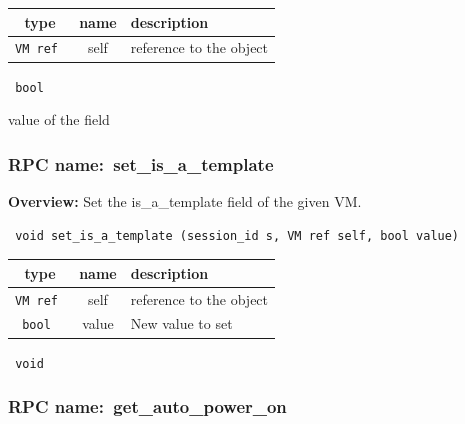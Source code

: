  
\vspace{0.3cm}
\begin{tabular}{|c|c|p{7cm}|}
 \hline
{\bf type} & {\bf name} & {\bf description} \\ \hline
{\tt VM ref } & self & reference to the object \\ \hline 

\end{tabular}

\vspace{0.3cm}

{\tt 
bool
}


value of the field
\vspace{0.3cm}
\vspace{0.3cm}
\vspace{0.3cm}
\subsubsection{RPC name:~set\_is\_a\_template}

{\bf Overview:} 
Set the is\_a\_template field of the given VM.

\begin{verbatim} void set_is_a_template (session_id s, VM ref self, bool value)\end{verbatim}



 
\vspace{0.3cm}
\begin{tabular}{|c|c|p{7cm}|}
 \hline
{\bf type} & {\bf name} & {\bf description} \\ \hline
{\tt VM ref } & self & reference to the object \\ \hline 

{\tt bool } & value & New value to set \\ \hline 

\end{tabular}

\vspace{0.3cm}

{\tt 
void
}



\vspace{0.3cm}
\vspace{0.3cm}
\vspace{0.3cm}
\subsubsection{RPC name:~get\_auto\_power\_on}

